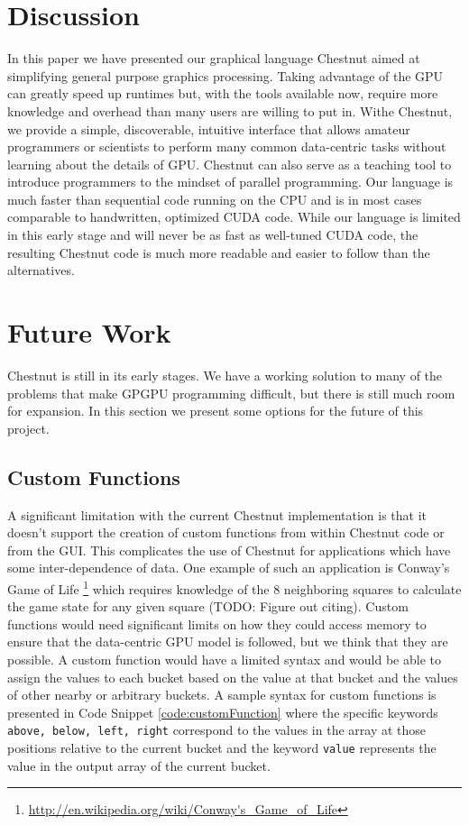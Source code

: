 \documentclass[twocolumn]{article}
\renewcommand{\|}{\origbar} %
\newcommand{\code}[1]{\texttt{#1}}
\begin{document}
\section{Discussion}
\label{sec:discussion}

In this paper we have presented our graphical language Chestnut aimed at simplifying general purpose graphics processing. Taking advantage of the GPU can greatly speed up runtimes but, with the tools available now, require more knowledge and overhead than many users are willing to put in. Withe Chestnut, we provide a simple, discoverable, intuitive interface that allows amateur programmers or scientists to perform many common data-centric tasks without learning about the details of GPU. Chestnut can also serve as a teaching tool to introduce programmers to the mindset of parallel programming. Our language is much faster than sequential code running on the CPU and is in most cases comparable to handwritten, optimized CUDA code. While our language is limited in this early stage and will never be as fast as well-tuned CUDA code, the resulting Chestnut code is much more readable and easier to follow than the alternatives. 

\section{Future Work}
\label{sec:future}

Chestnut is still in its early stages. We have a working solution to many of the problems that make GPGPU programming difficult, but there is still much room for expansion. In this section we present some options for the future of this project.

\subsection{Custom Functions}

A significant limitation with the current Chestnut implementation is that it doesn't support the creation of custom functions from within Chestnut code or from the GUI. This complicates the use of Chestnut for applications which have some inter-dependence of data. One example of such an application is Conway's Game of Life \footnote{\url{http://en.wikipedia.org/wiki/Conway's_Game_of_Life}} which requires knowledge of the 8 neighboring squares to calculate the game state for any given square (TODO: Figure out citing). Custom functions would need significant limits on how they could access memory to ensure that the data-centric GPU model is followed, but we think that they are possible. A custom function would have a limited syntax and would be able to assign the values to each bucket based on the value at that bucket and the values of other nearby or arbitrary buckets. A sample syntax for custom functions is presented in Code Snippet \ref{code:customFunction} where the specific keywords \code{above, below, left, right} correspond to the values in the array at those positions relative to the current bucket and the keyword \code{value} represents the value in the output array of the current bucket.
\end{document}
